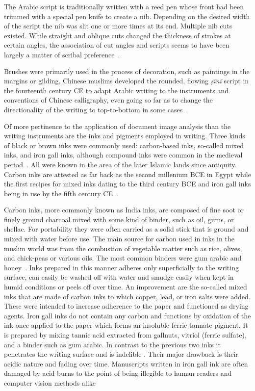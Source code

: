 The Arabic script is traditionally written with a reed pen whose front had been
trimmed with a special pen knife to create a nib. Depending on the desired
width of the script the nib was slit one or more times at its end. Multiple nib
cuts existed. While straight and oblique cuts changed the thickness of strokes
at certain angles, the association of cut angles and scripts seems to have been
largely a matter of scribal preference~\cite[pg. 42]{gacek2009arabic}.

Brushes were primarily used in the process of decoration, such as paintings in
the margins or gilding. Chinese muslims developed the rounded, flowing
\emph{ṣīnī} script in the fourteenth century CE to adapt Arabic writing to the
instruments and conventions of Chinese calligraphy, even going so far as to
change the directionality of the writing to top-to-bottom in some
cases~\cite[pg. 29-30]{ghoname2012sini}.

Of more pertinence to the application of document image analysis than the
writing instruments are the inks and pigments employed in writing. Three kinds
of black or brown inks were commonly used: carbon-based inks, so-called mixed
inks, and iron gall inks, although compound inks were common in the medieval
period~\cite[pg. 62-63]{blair2006islamic}. All were known in the area of the
later Islamic lands since antiquity. Carbon inks are attested as far back as
the second millenium BCE in Egypt while the first recipes for mixed inks dating
to the third century BCE and iron gall inks being in use by the fifth century
CE~\cite{christiansen2017manufacture}.

Carbon inks, more commonly known as India inks, are composed of fine soot or
finely ground charcoal mixed with some kind of binder, such as oil, gums, or
shellac. For portability they were often carried as a solid stick that is
ground and mixed with water before use. The main source for carbon used in inks
in the muslim world was from the combustion of vegetable matter such as rice,
olives, and chick-peas or various oils. The most common binders were gum arabic
and honey~\cite[pg. 133]{gacek2009arabic}. Inks prepared in this manner adheres
only superficially to the writing surface, can easily be washed off with water
and smudge easily when kept in humid conditions or peels off over time. An
improvement are the so-called mixed inks that are made of carbon inks to which
copper, lead, or iron salts were added. These were intended to increase
adherence to the paper and functioned as drying agents. Iron gall inks do not
contain any carbon and functions by oxidation of the ink once applied to the
paper which forms an insoluble ferric tannate pigment. It is prepared by mixing
tannic acid extracted from gallnuts, vitriol (ferric sulfate), and a binder
such as gum arabic. In contrast to the previous two inks it penetrates the
writing surface and is indelible \cite{christiansen2017manufacture}. Their
major drawback is their acidic nature and fading over time. Manuscripts written
in iron gall ink are often damaged by acid burns to the point of being
illegible to human readers and computer vision methods alike~\cite[pg.
145]{gacek2009arabic}

